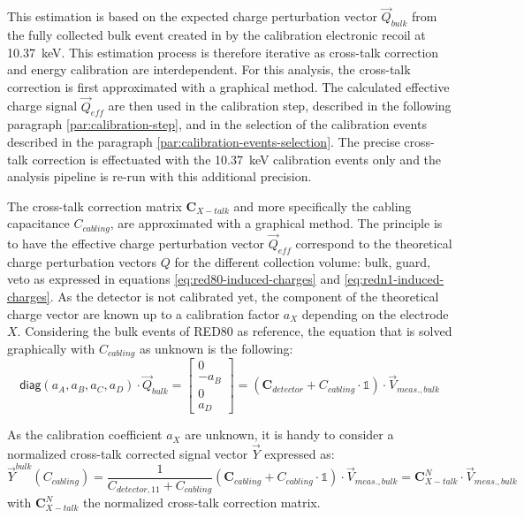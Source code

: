 This estimation is based on the expected charge perturbation vector $\vec{Q}_{bulk}$ from the fully collected bulk event created in by the calibration electronic recoil at \SI{10.37}{\kilo\eV}. This estimation process is therefore iterative as cross-talk correction and energy calibration are interdependent. 
For this analysis, the cross-talk correction is first approximated with a graphical method. The calculated effective charge signal $\vec{Q}_{eff}$ are then used in the calibration step, described in the following paragraph \ref{par:calibration-step}, and in the selection of the calibration events described in the paragraph \ref{par:calibration-events-selection}. The precise cross-talk correction is effectuated with the \SI{10.37}{\kilo\eV} calibration events only and the analysis pipeline is re-run with this additional precision.

The cross-talk correction matrix $\bm{C}_{X-talk}$ and more specifically the cabling capacitance $C_{cabling}$, are approximated with a graphical method. The principle is to have the effective charge perturbation vector $\vec{Q}_{eff}$ correspond to the theoretical charge perturbation vectors $Q$ for the different collection volume: bulk, guard, veto as expressed in equations \ref{eq:red80-induced-charges} and \ref{eq:redn1-induced-charges}. As the detector is not calibrated yet, the component of the theoretical charge vector are known up to a calibration factor $a_X$ depending on the electrode $X$. Considering the bulk events of RED80 as reference, the equation that is solved graphically with $C_{cabling}$ as unknown is the following:
\begin{equation}
\label{eq:crosstalk-correction}
\textsf{diag}(a_A, a_B, a_C, a_D)
\cdot
\vec{Q}_{bulk}
=
\begin{bmatrix}
0 \\ -a_B \\ 0 \\ a_D
\end{bmatrix} 
=
\left( \bm{C}_{detector} + C_{cabling} \cdot \mathbb{1} \right) \cdot \vec{V}_{meas., bulk}
\end{equation}

As the calibration coefficient $a_X$ are unknown, it is handy to consider a normalized cross-talk corrected signal vector $\vec{Y}$ expressed as:
\begin{equation}
\vec{Y}^{bulk} \left( C_{cabling} \right)
=
\frac{1}{C_{detector, 11} + C_{cabling}}
\left( \bm{C}_{cabling} + C_{cabling} \cdot \mathbb{1} \right) \cdot \vec{V}_{meas., bulk}
= \bm{C}_{X-talk}^N \cdot \vec{V}_{meas., bulk}
\end{equation}
with $\bm{C}_{X-talk}^N$ the normalized cross-talk correction matrix.

